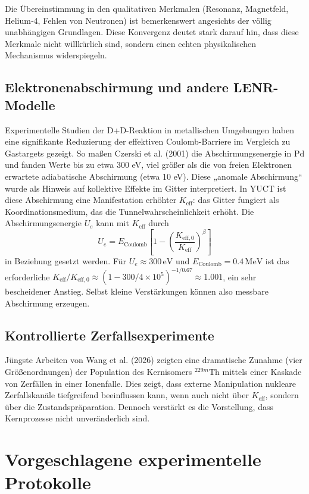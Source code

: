 \documentclass[12pt]{article}
\theoremstyle{remark}
\newcommand{\Keff}{K_{\mathrm{eff}}}
\newcommand{\Keffzero}{K_{\mathrm{eff},0}}
\begin{document}
	Die Übereinstimmung in den qualitativen Merkmalen (Resonanz, Magnetfeld, Helium‑4, Fehlen von Neutronen) ist bemerkenswert angesichts der völlig unabhängigen Grundlagen. Diese Konvergenz deutet stark darauf hin, dass diese Merkmale nicht willkürlich sind, sondern einen echten physikalischen Mechanismus widerspiegeln.
	
	\subsection{Elektronenabschirmung und andere LENR-Modelle}
	
	Experimentelle Studien der D+D-Reaktion in metallischen Umgebungen haben eine signifikante Reduzierung der effektiven Coulomb-Barriere im Vergleich zu Gastargets gezeigt. So maßen Czerski et al. (2001) die Abschirmungsenergie in Pd und fanden Werte bis zu etwa 300 eV, viel größer als die von freien Elektronen erwartete adiabatische Abschirmung (etwa 10 eV). Diese „anomale Abschirmung“ wurde als Hinweis auf kollektive Effekte im Gitter interpretiert. In YUCT ist diese Abschirmung eine Manifestation erhöhter \(\Keff\): das Gitter fungiert als Koordinationsmedium, das die Tunnelwahrscheinlichkeit erhöht. Die Abschirmungsenergie \(U_e\) kann mit \(\Keff\) durch
	\begin{equation}
		U_e = E_{\text{Coulomb}} \left[1 - \left(\frac{\Keffzero}{\Keff}\right)^{\beta}\right]
	\end{equation}
	in Beziehung gesetzt werden. Für \(U_e \approx 300\,\text{eV}\) und \(E_{\text{Coulomb}} = 0.4\,\text{MeV}\) ist das erforderliche \(\Keff/\Keffzero \approx (1 - 300/4\times10^5)^{-1/0.67} \approx 1.001\), ein sehr bescheidener Anstieg. Selbst kleine Verstärkungen können also messbare Abschirmung erzeugen.
	
	\subsection{Kontrollierte Zerfallsexperimente}
	
	Jüngste Arbeiten von Wang et al. (2026) zeigten eine dramatische Zunahme (vier Größenordnungen) der Population des Kernisomers \(^{229m}\)Th mittels einer Kaskade von Zerfällen in einer Ionenfalle. Dies zeigt, dass externe Manipulation nukleare Zerfallskanäle tiefgreifend beeinflussen kann, wenn auch nicht über \(\Keff\), sondern über die Zustandspräparation. Dennoch verstärkt es die Vorstellung, dass Kernprozesse nicht unveränderlich sind.
	
	\section{Vorgeschlagene experimentelle Protokolle}
	\label{sec:experiments}
	
\end{document}
